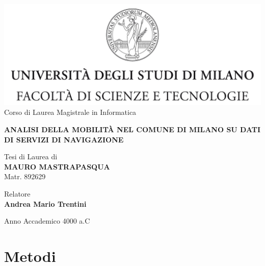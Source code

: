 \documentclass[12pt]{report}
\begin{document}
\begin{titlepage}
	\begin{center}
		\includegraphics[width=\textwidth]{Logo.jpg}
		\large{Corso di Laurea Magistrale in Informatica}
		
		\vspace{1.8cm}
		
		\LARGE{\textbf{ANALISI DELLA MOBILITÀ NEL COMUNE DI MILANO SU DATI DI SERVIZI DI NAVIGAZIONE}}
		
		\vspace{1.8cm}
		
		\large{Tesi di Laurea di} \\
		\large{\textbf{MAURO MASTRAPASQUA}} \\
		\large{Matr. 892629}
	\end{center}

	\begin{flushleft}
		\vspace{1.4cm}
		
		\large{Relatore} \\
		\large{\textbf{Andrea Mario Trentini}}
	\end{flushleft}

	\begin{center}
		\vspace{1.4cm}
		
		\large{Anno Accademico 4000 a.C}
	\end{center}
\end{titlepage}

\tableofcontents

\chapter{Metodi}

\end{document}
